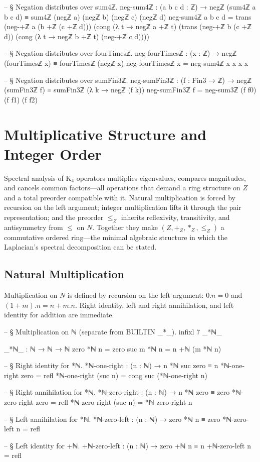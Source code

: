 \documentclass[11pt,a4paper]{book}
\def\cdot{.}%
\def\mathbb#1{#1}%
\begin{document}
\begin{code}
-- § Negation distributes over sum4ℤ.
neg-sum4ℤ : (a b c d : ℤ) → negℤ (sum4ℤ a b c d) ≡ sum4ℤ (negℤ a) (negℤ b) (negℤ c) (negℤ d)
neg-sum4ℤ a b c d =
  trans
    (neg-+ℤ a (b +ℤ (c +ℤ d)))
    (cong (λ t → negℤ a +ℤ t)
          (trans
            (neg-+ℤ b (c +ℤ d))
            (cong (λ t → negℤ b +ℤ t) (neg-+ℤ c d))))

-- § Negation distributes over fourTimesℤ.
neg-fourTimesℤ : (x : ℤ) → negℤ (fourTimesℤ x) ≡ fourTimesℤ (negℤ x)
neg-fourTimesℤ x = neg-sum4ℤ x x x x

-- § Negation distributes over sumFin3ℤ.
neg-sumFin3ℤ : (f : Fin3 → ℤ) → negℤ (sumFin3ℤ f) ≡ sumFin3ℤ (λ k → negℤ (f k))
neg-sumFin3ℤ f = neg-sum3ℤ (f f0) (f f1) (f f2)
\end{code}

\chapter{Multiplicative Structure and Integer Order}

Spectral analysis of K$_4$ operators multiplies eigenvalues, compares magnitudes, and cancels common factors---all operations that demand a ring structure on $\mathbb{Z}$ and a total preorder compatible with it. Natural multiplication is forced by recursion on the left argument; integer multiplication lifts it through the pair representation; and the preorder $\le_{\mathbb{Z}}$ inherits reflexivity, transitivity, and antisymmetry from $\le$ on $\mathbb{N}$. Together they make $(\mathbb{Z}, +_{\mathbb{Z}}, *_{\mathbb{Z}}, \le_{\mathbb{Z}})$ a commutative ordered ring---the minimal algebraic structure in which the Laplacian's spectral decomposition can be stated.

\section{Natural Multiplication}

Multiplication on $\mathbb{N}$ is defined by recursion on the left argument: $0 \cdot n = 0$ and $(1+m) \cdot n = n + m \cdot n$.
Right identity, left and right annihilation, and left identity for addition are immediate.

\begin{code}
-- § Multiplication on ℕ (separate from BUILTIN _*_).
infixl 7 _*ℕ_

_*ℕ_ : ℕ → ℕ → ℕ
zero *ℕ n = zero
suc m *ℕ n = n +ℕ (m *ℕ n)

-- § Right identity for *ℕ.
*ℕ-one-right : (n : ℕ) → n *ℕ suc zero ≡ n
*ℕ-one-right zero = refl
*ℕ-one-right (suc n) = cong suc (*ℕ-one-right n)

-- § Right annihilation for *ℕ.
*ℕ-zero-right : (n : ℕ) → n *ℕ zero ≡ zero
*ℕ-zero-right zero = refl
*ℕ-zero-right (suc n) = *ℕ-zero-right n

-- § Left annihilation for *ℕ.
*ℕ-zero-left : (n : ℕ) → zero *ℕ n ≡ zero
*ℕ-zero-left n = refl

-- § Left identity for +ℕ.
+ℕ-zero-left : (n : ℕ) → zero +ℕ n ≡ n
+ℕ-zero-left n = refl
\end{code}
\end{document}
